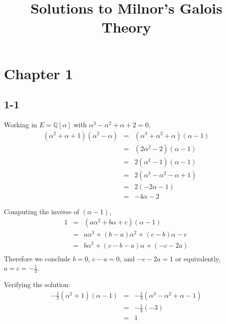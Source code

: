 \documentclass{article}
\begin{document}
\title{Solutions to Milnor's Galois Theory}

\maketitle

\section{Chapter 1}

\subsection{1-1}
Working in $E=\mathbb{Q}\left[\alpha\right] $ with $ \alpha^{3} - \alpha^{2} + \alpha + 2 = 0 $,
\begin{subequations}
\begin{align}
(\alpha^{2} + \alpha + 1)(\alpha^{2} - \alpha) & = & (\alpha^{3} + \alpha^{2} + \alpha)(\alpha - 1) \\
& = & (2\alpha^{2}-2)(\alpha - 1) \\
& = & 2(\alpha^{2}-1)(\alpha - 1) \\
& = & 2(\alpha^{3} - \alpha^{2} - \alpha + 1) \\
& = & 2(-2\alpha-1) \\
& = & -4\alpha-2
\end{align}
\end{subequations}

Computing the inverse of $(\alpha - 1) $,
\begin{subequations}
\begin{align}
1 & = & (a\alpha^{2} + b\alpha + c)(\alpha - 1) \\
& = & a\alpha^{3} + (b-a)\alpha^{2} + (c-b)\alpha - c \\
& = & b\alpha^{2} + (c-b-a)\alpha + (-c-2a) \\
\end{align}
\end{subequations}
Therefore we conclude $ b = 0 $, $ c - a = 0 $, and $ - c - 2a = 1 $ or equivalently, $ a = c = -\frac{1}{3} $.

Verifying the solution:
\begin{subequations}
\begin{align}
-\frac{1}{3}(\alpha^{2}+1)(\alpha-1) & = & -\frac{1}{3}(\alpha^{3}-\alpha^{2}+\alpha-1) \\
& = & -\frac{1}{3}(-3) \\
& = & 1
\end{align}
\end{subequations}
\end{document}
